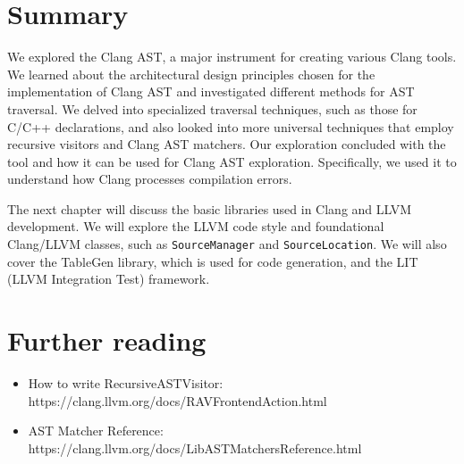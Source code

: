 \section{Summary}
We explored the Clang AST, a major instrument for creating various Clang
tools. We learned about the architectural design principles chosen for the
implementation of Clang AST and investigated different methods for AST
traversal. We delved into specialized traversal techniques, such as those for
C/C++ declarations, and also looked into more universal techniques that employ
recursive visitors and Clang AST matchers. Our exploration concluded with the
 tool and how it can be used for Clang AST
exploration. Specifically, we used it to understand how Clang processes
compilation errors. 

The next chapter will discuss the basic libraries used in Clang and LLVM
development. We will explore the LLVM code style and foundational Clang/LLVM
classes, such as \texttt{SourceManager} and
\texttt{SourceLocation}. We will also cover the TableGen library, which
is used for code generation, and the LIT (LLVM Integration Test) framework. 

\section{Further reading}
\begin{itemize}
  \item How to write RecursiveASTVisitor:
    https://clang.llvm.org/docs/RAVFrontendAction.html
  \item AST Matcher Reference: https://clang.llvm.org/docs/LibASTMatchersReference.html
\end{itemize}


